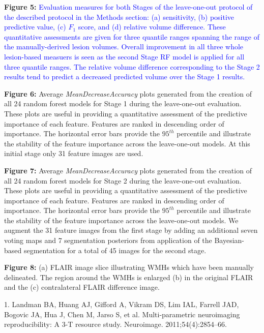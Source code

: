 \documentclass[12pt,]{article}
\begin{document}
\textbf{Figure 5:}
\textcolor{blue}{Evaluation measures for both Stages of the leave-one-out protocol of the described protocol in the Methods
section:  (a) sensitivity, (b) positive predictive value, (c) $F_1$ score, and (d) relative
volume difference.   These quantitative assessments are given for three quantile ranges
spanning the range of the manually-derived lesion volumes.    Overall improvement in all
three whole lesion-based measuers is seen as the
second Stage RF model is applied for all three quantile ranges.
The relative volume difference corresponding to the Stage 2 results tend to predict a
decreased predicted volume over the Stage 1 results.}

\textbf{Figure 6:} Average \emph{MeanDecreaseAccuracy} plots generated
from the creation of all 24 random forest models for Stage 1 during the
leave-one-out evaluation. These plots are useful in providing a
quantitative assessment of the predictive importance of each feature.
Features are ranked in descending order of importance. The horizontal
error bars provide the \(95^{th}\) percentile and illustrate the
stability of the feature importance across the leave-one-out models. At
this initial stage only 31 feature images are used.

\textbf{Figure 7:} Average \emph{MeanDecreaseAccuracy} plots generated
from the creation of all 24 random forest models for Stage 2 during the
leave-one-out evaluation. These plots are useful in providing a
quantitative assessment of the predictive importance of each feature.
Features are ranked in descending order of importance. The horizontal
error bars provide the \(95^{th}\) percentile and illustrate the
stability of the feature importance across the leave-one-out models. We
augment the 31 feature images from the first stage by adding an
additional seven voting maps and 7 segmentation posteriors from
application of the Bayesian-based segmentation for a total of 45 images
for the second stage.

\textbf{Figure 8:} (a) FLAIR image slice illustrating WMHs which have
been manually delineated. The region around the WMHs is enlarged (b) in
the original FLAIR and the (c) contralateral FLAIR difference image.

\clearpage

\hypertarget{refs}{}
\hypertarget{ref-landman2011}{}
1. Landman BA, Huang AJ, Gifford A, Vikram DS, Lim IAL, Farrell JAD,
Bogovic JA, Hua J, Chen M, Jarso S, et al. Multi-parametric neuroimaging
reproducibility: A 3-T resource study. Neuroimage. 2011;54(4):2854--66.
\end{document}
